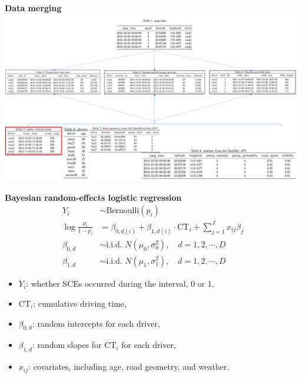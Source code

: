 \documentclass[aspectratio=43]{beamer}
\begin{document}
\begin{frame}{\textbf{Data merging}}
\centering
  \includegraphics[width=\textwidth, height = \textheight, keepaspectratio, frame]{Figures/flow_chart.png}
\end{frame}

\begin{frame}{\textbf{Bayesian random-effects logistic regression}}
\begin{equation}\label{eq:logit}
\begin{split}
Y_{i} &\sim \text{Bernoulli}(p_{i})\\
\log\frac{p_{i}}{1-p_{i}} &= \beta_{0, d(i)} + \beta_{1, d(i)} \cdot \text{CT}_i + \sum_{j=1}^{J} x_{ij}\beta_j\\
\beta_{0, d} &\sim \text{i.i.d. } N(\mu_0, \sigma_0^2), \quad d = 1, 2, \cdots, D\\
\beta_{1, d} &\sim \text{i.i.d. } N(\mu_1, \sigma_1^2), \quad d = 1, 2, \cdots, D
\end{split}
\end{equation}
\begin{itemize}
    \item $Y_i$: whether SCEs occurred during the interval, 0 or 1,
    \item CT$_i$: cumulative driving time,
    \item $\beta_{0, d}$: random intercepts for each driver,
    \item $\beta_{1, d}$: random slopes for CT$_i$ for each driver,
    \item $x_{ij}$: covariates, including age, road geometry, and weather.
\end{itemize}
\end{frame}
\end{document}
